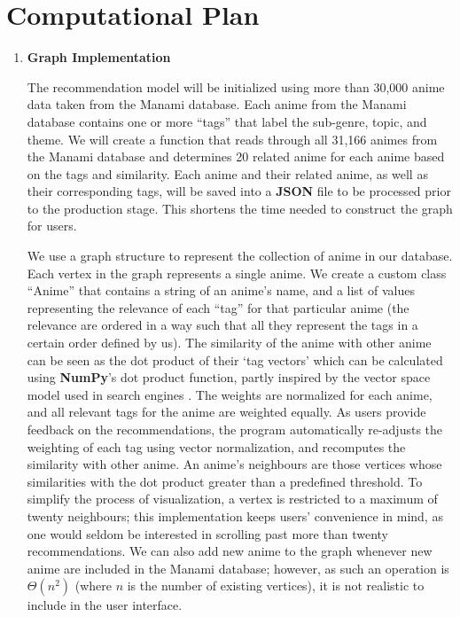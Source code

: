 \documentclass[fontsize=11pt]{article}
\begin{document}
\section*{Computational Plan}

\begin{enumerate}
    \item \textbf{Graph Implementation}
    
    \quad The recommendation model will be initialized using more than 30,000 anime data taken from the Manami database. Each anime from the Manami database contains one or more “tags” that label the sub-genre, topic, and theme. We will create a function that reads through all 31,166 animes from the Manami database and determines 20 related anime for each anime based on the tags and similarity. Each anime and their related anime, as well as their corresponding tags, will be saved into a \textbf{JSON} file to be processed prior to the production stage. This shortens the time needed to construct the graph for users.
    
    \quad We use a graph structure to represent the collection of anime in our database. Each vertex in the graph represents a single anime. We create a custom class “Anime” that contains a string of an anime’s name, and a list of values representing the relevance of each “tag” for that particular anime (the relevance are ordered in a way such that all they represent the tags in a certain order defined by us). The similarity of the anime with other anime can be seen as the dot product of their ‘tag vectors’ which can be calculated using \textbf{NumPy}’s dot product function, partly inspired by the vector space model used in search engines \citep{vspace}. The weights are normalized for each anime, and all relevant tags for the anime are weighted equally. As users provide feedback on the recommendations, the program automatically re-adjusts the weighting of each tag using vector normalization, and recomputes the similarity with other anime. An anime’s neighbours are those vertices whose similarities with the dot product greater than a predefined threshold. To simplify the process of visualization, a vertex is restricted to a maximum of twenty neighbours; this implementation keeps users' convenience in mind, as one would seldom be interested in scrolling past more than twenty recommendations. We can also add new anime to the graph whenever new anime are included in the Manami database; however, as such an operation is $\Theta(n^2)$ (where $n$ is the number of existing vertices), it is not realistic to include in the user interface.
    

\end{enumerate}
\end{document}
